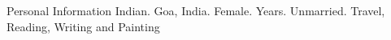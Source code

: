 \begin{rubric}{Personal Information}
\entry*[Nationality]
	Indian.
	Goa, India.
\entry*[Gender]
	Female.
 Years.	
	Unmarried.	
\entry*[Hobbies]
	Travel, Reading, Writing and Painting	

\end{rubric}
